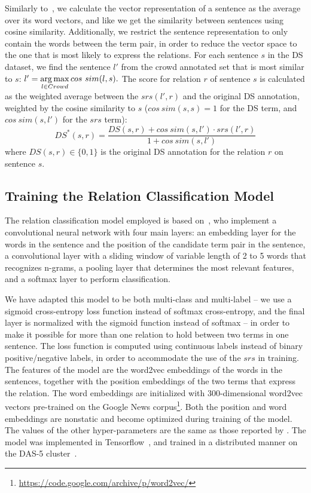 Similarly to~\citet{sultan2015dls}, we calculate the vector representation of a sentence as the average over its word vectors, and like \citet{sterckx2016knowledge} we get the similarity between sentences using cosine similarity. Additionally, we restrict the sentence representation to only contain the words between the term pair, in order to reduce the vector space to the one that is most likely to express the relations. For each sentence $s$ in the DS dataset, we find the sentence $l'$ from the crowd annotated set that is most similar to $s$: $ l' = \operatorname*{arg\,max}\limits_{l \in Crowd} cos\ sim(l, s). $ The score for relation $r$ of sentence $s$ is calculated as the weighted average between the $srs(l', r)$ and the original DS annotation, weighted by the cosine similarity to $s$ ($ cos\ sim(s,s) = 1$ for the DS term, and $ cos\ sim(s, l')$ for the $srs$ term):
\begin{equation} \label{eq:ds_w2v}
DS^{*}(s, r) =  \dfrac{DS(s, r) +  cos\ sim(s, l') \cdot srs(l', r)}{1 +  cos\ sim(s, l')}
\end{equation}
\noindent where $DS(s, r) \in \{0,1\}$ is the original DS annotation for the relation $r$ on sentence $s$.


\subsection{Training the Relation Classification Model}
\label{sec:train}

The relation classification model employed is based on~\citet{nguyen2015relation}, who implement a convolutional neural network with four main layers: an embedding layer for the words in the sentence and the position of the candidate term pair in the sentence, a convolutional layer with a sliding window of variable length of 2 to 5 words that recognizes n-grams, a pooling layer that determines the most relevant features, and a softmax layer to perform classification.

We have adapted this model to be both multi-class and multi-label -- we use a sigmoid cross-entropy loss function instead of softmax cross-entropy, and the final layer is normalized with the sigmoid function instead of softmax -- in order to make it possible for more than one relation to hold between two terms in one sentence. The loss function is computed using continuous labels instead of binary positive/negative labels, in order to accommodate the use of the $srs$ in training. The features of the model are the word2vec embeddings of the words in the sentences, together with the position embeddings of the two terms that express the relation. The word embeddings are initialized with 300-dimensional word2vec vectors pre-trained on the Google News corpus\footnote{\url{https://code.google.com/archive/p/word2vec/}}. Both the position and word embeddings are nonstatic and become optimized during training of the model. The values of the other hyper-parameters are the same as those reported by \citet{nguyen2015relation}. The model was implemented in Tensorflow~\cite{abadi2016tensorflow}, and trained in a distributed manner on the DAS-5 cluster~\cite{bal2016medium}.

